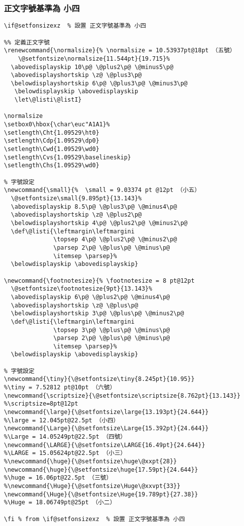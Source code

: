 \subsubsection{正文字號基準為 小四}
\begin{lstlisting}[firstnumber=416]
\if@setfonsizexz  % 設置 正文字號基準為 小四

%% 定義正文字號
\renewcommand{\normalsize}{% \normalsize = 10.53937pt@18pt （五號）
    \@setfontsize\normalsize{11.544pt}{19.715}%
  \abovedisplayskip 10\p@ \@plus2\p@ \@minus5\p@
  \abovedisplayshortskip \z@ \@plus3\p@
  \belowdisplayshortskip 6\p@ \@plus3\p@ \@minus3\p@
   \belowdisplayskip \abovedisplayskip
   \let\@listi\@listI}

\normalsize
\setbox0\hbox{\char\euc"A1A1}%
\setlength\Cht{1.09529\ht0}
\setlength\Cdp{1.09529\dp0}
\setlength\Cwd{1.09529\wd0}
\setlength\Cvs{1.09529\baselineskip}
\setlength\Chs{1.09529\wd0}

% 字號設定
\newcommand{\small}{%  \small = 9.03374 pt @12pt （小五）
  \@setfontsize\small{9.895pt}{13.143}%
  \abovedisplayskip 8.5\p@ \@plus3\p@ \@minus4\p@
  \abovedisplayshortskip \z@ \@plus2\p@
  \belowdisplayshortskip 4\p@ \@plus2\p@ \@minus2\p@
  \def\@listi{\leftmargin\leftmargini
              \topsep 4\p@ \@plus2\p@ \@minus2\p@
              \parsep 2\p@ \@plus\p@ \@minus\p@
              \itemsep \parsep}%
  \belowdisplayskip \abovedisplayskip}

\newcommand{\footnotesize}{% \footnotesize = 8 pt@12pt
  \@setfontsize\footnotesize{9pt}{13.143}%
  \abovedisplayskip 6\p@ \@plus2\p@ \@minus4\p@
  \abovedisplayshortskip \z@ \@plus\p@
  \belowdisplayshortskip 3\p@ \@plus\p@ \@minus2\p@
  \def\@listi{\leftmargin\leftmargini
              \topsep 3\p@ \@plus\p@ \@minus\p@
              \parsep 2\p@ \@plus\p@ \@minus\p@
              \itemsep \parsep}%
  \belowdisplayskip \abovedisplayskip}

% 字號設定
\newcommand{\tiny}{\@setfontsize\tiny{8.245pt}{10.95}}					     %\tiny = 7.52812 pt@10pt （六號）
\newcommand{\scriptsize}{\@setfontsize\scriptsize{8.762pt}{13.143}}	 %\scriptsize=8pt@12pt
\newcommand{\large}{\@setfontsize\large{13.193pt}{24.644}}	  		   %\large = 12.045pt@22.5pt （小四）
\newcommand{\Large}{\@setfontsize\Large{15.392pt}{24.644}}	  		   %\Large = 14.05249pt@22.5pt （四號）
\newcommand{\LARGE}{\@setfontsize\LARGE{16.49pt}{24.644}}  				   %\LARGE = 15.05624pt@22.5pt （小三）
%\newcommand{\huge}{\@setfontsize\huge\@xxpt{28}}
\newcommand{\huge}{\@setfontsize\huge{17.59pt}{24.644}}    				   %\huge = 16.06pt@22.5pt （三號）
%\newcommand{\Huge}{\@setfontsize\Huge\@xxvpt{33}}
\newcommand{\Huge}{\@setfontsize\Huge{19.789pt}{27.38}}   				   %\Huge = 18.06749pt@25pt （小二）

\fi % from \if@setfonsizexz  % 設置 正文字號基準為 小四
\end{lstlisting}

